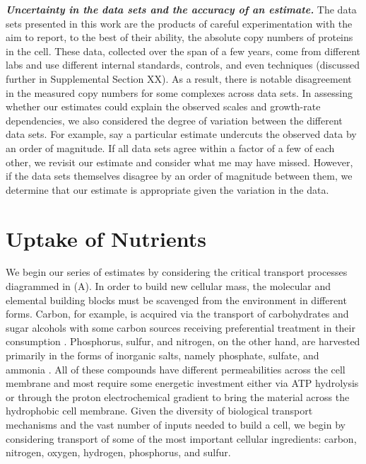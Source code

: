 \begin{featurebox}
\textbf{\itshape Uncertainty in the data sets and the accuracy of an estimate.}
The data sets presented in this work are the products of
careful experimentation with the aim to report, to the best of their ability,
the absolute copy numbers of proteins in the cell. These data, collected over
the span of a few years, come from different labs and use different internal
standards, controls, and even techniques (discussed further in Supplemental Section XX).
As a result, there is notable disagreement in the measured copy numbers for
some complexes across data sets. In assessing whether our estimates could explain the
observed scales and growth-rate dependencies, we also considered the degree of
variation between the different data sets. For example, say a particular
estimate undercuts the observed data by an order of magnitude. If all data sets
agree within a factor of a few of each other, we revisit our estimate and
consider what me may have missed. However, if the data sets themselves disagree
by an order of magnitude between them, we determine that our estimate is
appropriate given the variation in the data.
\label{box:estimate_rules}
\end{featurebox}


\section{Uptake of Nutrients}
We begin our series of estimates by considering the critical transport
processes diagrammed in (A). In order to build new cellular
mass, the molecular and elemental building blocks must be scavenged from the
environment in different forms. Carbon, for example, is acquired via the
transport of carbohydrates and sugar alcohols with some carbon sources
receiving preferential treatment in their consumption \citep{monod1947}.
Phosphorus, sulfur, and nitrogen, on the other hand, are harvested primarily
in the forms of inorganic salts, namely phosphate, sulfate, and ammonia
\citep{jun2018, assentoft2016, stasi2019, antonenko1997, rosenberg1977,
willsky1973}. All of these compounds have different permeabilities across the
cell membrane \cite{phillips2018} and most require some energetic investment
either via ATP hydrolysis or through the proton electrochemical gradient to
bring the material across the hydrophobic cell membrane. Given the diversity
of biological transport mechanisms and the vast number of inputs needed to
build a cell, we begin by considering transport of some of the most important
cellular ingredients: carbon, nitrogen, oxygen, hydrogen, phosphorus, and
sulfur.

